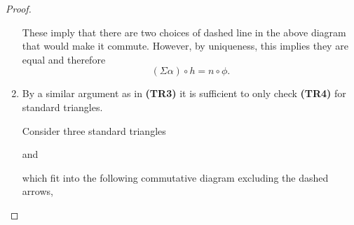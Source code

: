 \begin{proof}
\begin{enumerate}[label={(\bfseries TR\arabic*)}]
{            These imply that there are two choices of dashed line in the above diagram that would make it commute. However, by uniqueness, this implies they are equal and therefore
            \[
                (\Sigma \alpha) \circ h = n \circ \phi.
            \]
        }
        \item {
            By a similar argument as in {\bf (TR3)} it is sufficient to only check {\bf (TR4)} for standard triangles.

            Consider three standard triangles
            \begin{center}
            \end{center}
            and
            \begin{center}
            \end{center}
            which fit into the following commutative diagram excluding the dashed arrows,
            \begin{center}
\end{center}}
\end{enumerate}
\end{proof}
